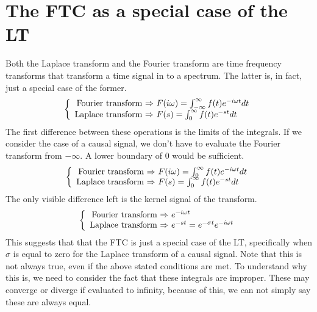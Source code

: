 \documentclass[]{subfiles}
\begin{document}
	\section{The FTC as a special case of the LT}
	Both  the  Laplace  transform  and  the  Fourier  transform  are  time  frequency  transforms that transform a time signal in to a spectrum. The latter is, in fact, just a special case of the former. 
		\begin{equation}
		\left\{ \begin{array}{r@{\text{ $\Rightarrow$ }}l}
			\text{Fourier transform}& F(i\omega)= \int_{-\infty}^{\infty}f(t)e^{-i\omega t}dt \\
			\text{Laplace transform}&F(s)=\int_{0}^{\infty}f(t)e^{-st} dt
		\end{array}\right.
	\end{equation}
	The first difference between these operations is the limits of the integrals. If we consider the case of a causal signal, we don't have to evaluate the Fourier transform from $-\infty$. A lower boundary  of $0$ would be sufficient. 
			\begin{equation}
		\left\{ \begin{array}{r@{\text{ $\Rightarrow$ }}l}
			\text{Fourier transform}& F(i\omega)= \int_{0}^{\infty}f(t)e^{-i\omega t}dt \\
			\text{Laplace transform}&F(s)=\int_{0}^{\infty}f(t)e^{-st} dt
		\end{array}\right.
	\end{equation}
	The only visible difference left is the kernel signal of the transform. 
				\begin{equation}
		\left\{ \begin{array}{r@{\text{ $\Rightarrow$ }}l}
			\text{Fourier transform}& e^{-i\omega t} \\
			\text{Laplace transform}&e^{-st} = e^{-\sigma t} e^{-i\omega t}
		\end{array}\right.
	\end{equation}
	This suggests that that the FTC is just a special case of the LT, specifically when $\sigma$ is equal to zero for the Laplace transform of a causal signal. Note that this is not always true, even if the above stated conditions are met. To understand why this is, we need to consider the fact that these integrals are improper. These may converge or diverge if evaluated to infinity, because of this, we can not simply say these are always equal.
\end{document}
